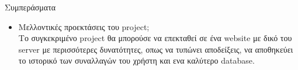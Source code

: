 \documentclass{beamer}
\begin{document}
\begin{frame}{Συμπεράσματα}
\begin{itemize}
  
  \item Μελλοντικές προεκτάσεις του project;
  \vspace{0.2cm}
  \\ Το συγκεκριμένο project θα μπορούσε να επεκταθεί σε ένα website με δικό του server με περισσότερες δυνατότητες, οπως να τυπώνει αποδείξεις, να αποθηκεύει το ιστορικό των συναλλαγών του χρήστη και ενα καλύτερο database.
\end{itemize}
\end{frame}
\end{document}

